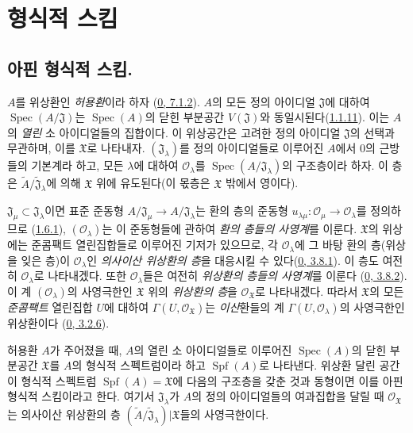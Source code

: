 \section{형식적 스킴}
\label{section:I.10-ko}

\subsection{아핀 형식적 스킴.}
\label{subsection:I.10.1-ko}

\begin{env}[10.1.1]
\label{I.10.1.1-ko}
$A$를 위상환인 \emph{허용환}이라 하자
(\hyperref[0.7.1.2-ko]{0, 7.1.2}). $A$의 모든 정의 아이디얼
$\mathfrak{J}$에 대하여 $\operatorname{Spec}(A/\mathfrak{J})$는
$\operatorname{Spec}(A)$의 닫힌 부분공간 $V(\mathfrak{J})$와
동일시된다(\hyperref[I.1.1.11-ko]{1.1.11}). 이는 $A$의
\emph{열린} 소 아이디얼들의 집합이다. 이 위상공간은 고려한
정의 아이디얼 $\mathfrak{J}$의 선택과 무관하며, 이를
$\mathfrak{X}$로 나타내자. $(\mathfrak{J}_\lambda)$를 정의
아이디얼들로 이루어진 $A$에서 0의 근방들의 기본계라 하고, 모든
$\lambda$에 대하여 $\mathscr{O}_\lambda$를
$\operatorname{Spec}(A/\mathfrak{J}_\lambda)$의 구조층이라 하자. 이 층은
$\widetilde{A}/\widetilde{\mathfrak{J}}_\lambda$에 의해
$\mathfrak{X}$ 위에 유도된다(이 몫층은 $\mathfrak{X}$ 밖에서 영이다).

$\mathfrak{J}_\mu\subset\mathfrak{J}_\lambda$이면 표준 준동형
$A/\mathfrak{J}_\mu\to A/\mathfrak{J}_\lambda$는 환의 층의 준동형
$u_{\lambda\mu}:\mathscr{O}_\mu\to\mathscr{O}_\lambda$를 정의하므로
(\hyperref[I.1.6.1-ko]{1.6.1}), $(\mathscr{O}_\lambda)$는 이 준동형들에
관하여 \emph{환의 층들의 사영계}를 이룬다. $\mathfrak{X}$의 위상에는
준콤팩트 열린집합들로 이루어진 기저가 있으므로, 각
$\mathscr{O}_\lambda$에 그 바탕 환의 층(위상을 잊은 층)이
$\mathscr{O}_\lambda$인 \emph{의사이산 위상환의 층}을 대응시킬 수
있다(\hyperref[0.3.8.1-ko]{0, 3.8.1}). 이 층도 여전히
$\mathscr{O}_\lambda$로 나타내겠다. 또한 $\mathscr{O}_\lambda$들은
여전히 \emph{위상환의 층들의 사영계}를 이룬다
(\hyperref[0.3.8.2-ko]{0, 3.8.2}). 이 계
$(\mathscr{O}_\lambda)$의 사영극한인 $\mathfrak{X}$ 위의
\emph{위상환의 층}을 $\mathscr{O}_{\mathfrak{X}}$로 나타내겠다. 따라서
$\mathfrak{X}$의 모든 \emph{준콤팩트} 열린집합 $U$에 대하여
$\Gamma(U,\mathscr{O}_{\mathfrak{X}})$는 \emph{이산}환들의 계
$\Gamma(U,\mathscr{O}_\lambda)$의 사영극한인 위상환이다
(\hyperref[0.3.2.6-ko]{0, 3.2.6}).
\end{env}

\begin{definition}[10.1.2]
\label{I.10.1.2-ko}
허용환 $A$가 주어졌을 때, $A$의 열린 소 아이디얼들로 이루어진
$\operatorname{Spec}(A)$의 닫힌 부분공간 $\mathfrak{X}$를 $A$의
형식적 스펙트럼이라 하고 $\operatorname{Spf}(A)$로 나타낸다. 위상환 달린
공간이 형식적 스펙트럼 $\operatorname{Spf}(A)=\mathfrak{X}$에 다음의
구조층을 갖춘 것과 동형이면 이를 아핀 형식적 스킴이라고 한다. 여기서
$\mathfrak{J}_\lambda$가 $A$의 정의 아이디얼들의 여과집합을 달릴 때
$\mathscr{O}_{\mathfrak{X}}$는
의사이산 위상환의 층
$(\widetilde{A}/\widetilde{\mathfrak{J}}_\lambda)|\mathfrak{X}$들의
사영극한이다.
\end{definition}

